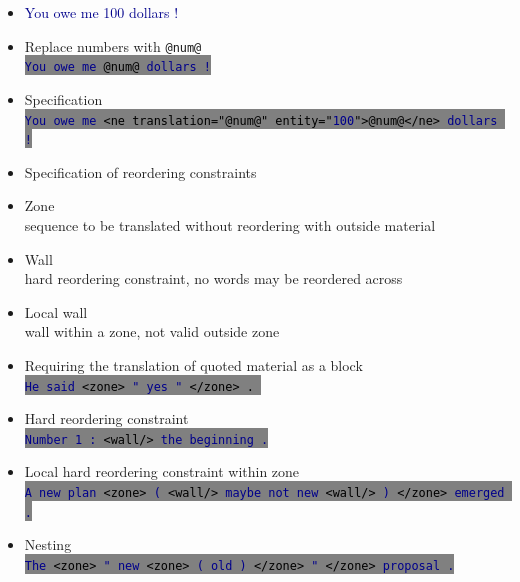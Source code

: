 \documentclass[landscape]{uedslides2C}
\newcommand{\example}[1]{\textcolor{darkblue}{\rm #1}}
\newcommand{\littlecode}[1]{\colorbox{gray}{\textcolor{black}{\small \tt #1}}}
\begin{document}

\vspace{2cm}
\begin{itemize}
\item \example{You owe me 100 dollars !}
\item Replace numbers with {\tt @num@}\\[4mm]
 \littlecode{\example{You owe me} @num@ \example{dollars !}}
\item Specification\\[4mm]
 \littlecode{\example{You owe me}  <ne translation="@num@" entity="\example{100}">@num@</ne> \example{dollars !}}
\end{itemize}



\vspace{10mm}
\begin{itemize}
\item Specification of reordering constraints
\item Zone\\[2mm] sequence to be translated without reordering with outside material
\item Wall\\[2mm] hard reordering constraint, no words may be reordered across
\item Local wall\\[2mm] wall within a zone, not valid outside zone
\end{itemize}


\vspace{10mm}
\begin{itemize}
\item Requiring the translation of quoted material as a block\\
\littlecode{\example{He said} <zone> \example{" yes "} </zone> . }
\item Hard reordering constraint\\
\littlecode{\example{Number 1 : }<wall/> \example{the beginning .}}
\item Local hard reordering constraint within zone\\
\littlecode{\example{A new plan} <zone> \example{(} <wall/> \example{maybe not new} <wall/> \example{)} </zone> \example{emerged .}}
\item Nesting\\
\littlecode{\example{The} <zone> \example{" new} <zone> \example{( old )} </zone> \example{"} </zone> \example{proposal .}}
\end{itemize}
\end{document}
